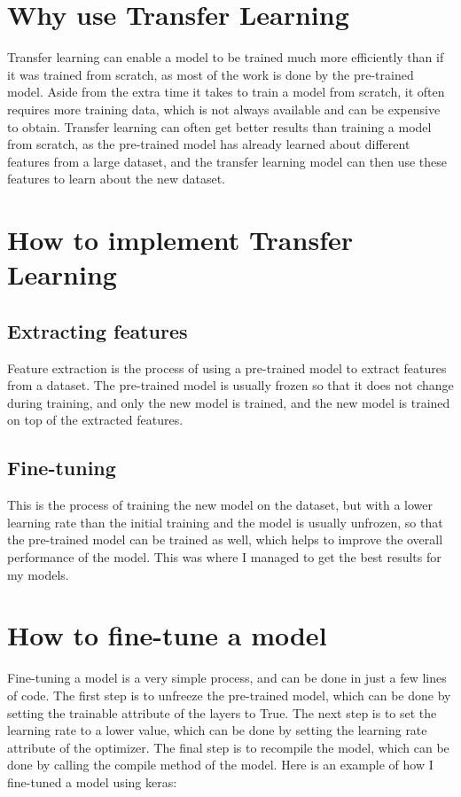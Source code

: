 \documentclass[]{final_report}
\begin{document}
\section{Why use Transfer Learning}
Transfer learning can enable a model to be trained much more efficiently than if it was trained from scratch, as most of the work is done by the pre-trained model.
Aside from the extra time it takes to train a model from scratch, it often requires more training data, which is not always available and can be expensive to obtain.
Transfer learning can often get better results than training a model from scratch, as the pre-trained model has already learned about different features from a large dataset,
and the transfer learning model can then use these features to learn about the new dataset.

\pagebreak
\section{How to implement Transfer Learning}

\subsection{Extracting features}
Feature extraction is the process of using a pre-trained model to extract features from a dataset.
The pre-trained model is usually frozen so that it does not change during training, and only the new model is trained,
and the new model is trained on top of the extracted features.

\subsection{Fine-tuning}
This is the process of training the new model on the dataset, but with a lower learning rate than the initial training and the model is usually unfrozen,
so that the pre-trained model can be trained as well, which helps to improve the overall performance of the model.
This was where I managed to get the best results for my models.

\section{How to fine-tune a model}
Fine-tuning a model is a very simple process, and can be done in just a few lines of code.
The first step is to unfreeze the pre-trained model, which can be done by setting the trainable attribute of the layers to True.
The next step is to set the learning rate to a lower value, which can be done by setting the learning rate attribute of the optimizer.
The final step is to recompile the model, which can be done by calling the compile method of the model.
Here is an example of how I fine-tuned a model using keras:
\end{document}
